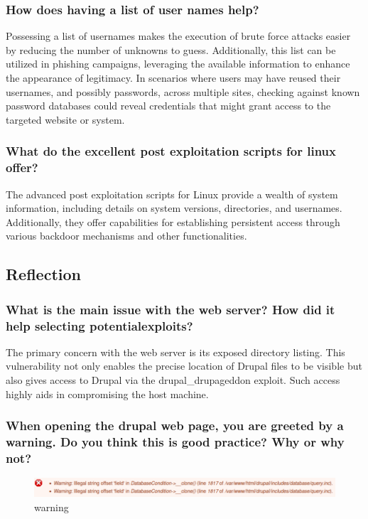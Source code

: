 \subsubsection{How does having a list of user names help?}
Possessing a list of usernames makes the execution of brute force attacks easier by reducing the number of unknowns to guess.
Additionally, this list can be utilized in phishing campaigns, leveraging the available information to enhance the appearance of legitimacy.
In scenarios where users may have reused their usernames, and possibly passwords, across multiple sites,
checking against known password databases could reveal credentials that might grant access to the targeted website or system.


\subsubsection{What do the excellent post exploitation scripts for linux offer?}
The advanced post exploitation scripts for Linux provide a wealth of system information, including details on system versions, directories, and usernames.
Additionally, they offer capabilities for establishing persistent access through various backdoor mechanisms and other functionalities.


\subsection{Reflection}

\subsubsection{What is the main issue with the web server? How did it help selecting potentialexploits?}
The primary concern with the web server is its exposed directory listing.
This vulnerability not only enables the precise location of Drupal files to be visible but also gives access to Drupal via the drupal\_drupageddon exploit.
Such access highly aids in compromising the host machine.

\subsubsection{When opening the drupal web page, you are greeted by a warning. Do you think this is good practice? Why or why not?}

\begin{figure}[H]
    \centering
    \includegraphics[width=0.9\linewidth]{pic/warning.png}
    \caption{warning}
    \label{fig:warning}
\end{figure}

